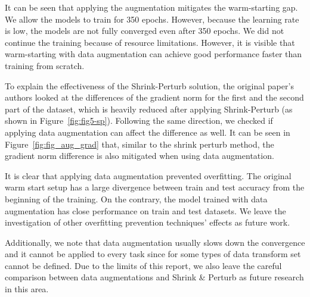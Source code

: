 It can be seen that applying the augmentation mitigates the warm-starting gap. We allow the models to train for 350 epochs. However, because the learning rate is low, the models are not fully converged even after 350 epochs. We did not continue the training because of resource limitations. However, it is visible that warm-starting with data augmentation can achieve good performance faster than training from scratch. 

To explain the effectiveness of the Shrink-Perturb solution, the original paper's authors looked at the differences of the gradient norm for the first and the second part of the dataset, which is heavily reduced after applying Shrink-Perturb (as shown in Figure~\ref{fig:fig5-sp}). Following the same direction, we checked if applying data augmentation can affect the difference as well. It can be seen in Figure~\ref{fig:fig_aug_grad} that, similar to the shrink perturb method, the gradient norm difference is also mitigated when using data augmentation. 

It is clear that applying data augmentation prevented overfitting. The original warm start setup has a large divergence between train and test accuracy from the beginning of the training. On the contrary, the model trained with data augmentation has close performance on train and test datasets. We leave the investigation of other overfitting prevention techniques' effects as future work.

Additionally, we note that data augmentation usually slows down the convergence and it cannot be applied to every task since for some types of data transform set cannot be defined. Due to the limits of this report, we also leave the careful comparison between data augmentations and Shrink \& Perturb as future research in this area.

%
%
%

